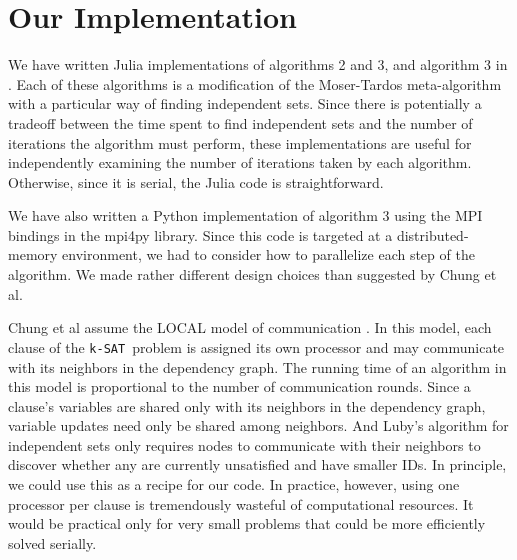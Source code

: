 \documentclass[twocolumn]{article}
\newcommand{\ksat}{\texttt{k-SAT}~}
\begin{document}
\section{Our Implementation}
\label{sec:implementation}
We have written Julia implementations of algorithms 2 and 3, and algorithm 3 in \cite{chung2014distributed}.  Each of these algorithms is a modification of the Moser-Tardos meta-algorithm with a particular way of finding independent sets.  Since there is potentially a tradeoff between the time spent to find independent sets and the number of iterations the algorithm must perform, these implementations are useful for independently examining the number of iterations taken by each algorithm.  Otherwise, since it is serial, the Julia code is straightforward. 

We have also written a Python implementation of algorithm 3 using the MPI bindings in the mpi4py library.  Since this code is targeted at a distributed-memory environment, we had to consider how to parallelize each step of the algorithm.  We made rather different design choices than suggested by Chung et al.

Chung et al assume the LOCAL model of communication \cite{peleg2000distributed}.  In this model, each clause of the \ksat problem is assigned its own processor and may communicate with its neighbors in the dependency graph.  The running time of an algorithm in this model is proportional to the number of communication rounds.  Since a clause's variables are shared only with its neighbors in the dependency graph, variable updates need only be shared among neighbors.  And Luby's algorithm for independent sets only requires nodes to communicate with their neighbors to discover whether any are currently unsatisfied and have smaller IDs.  In principle, we could use this as a recipe for our code.  In practice, however, using one processor per clause is tremendously wasteful of computational resources.  It would be practical only for very small problems that could be more efficiently solved serially.
\end{document}
